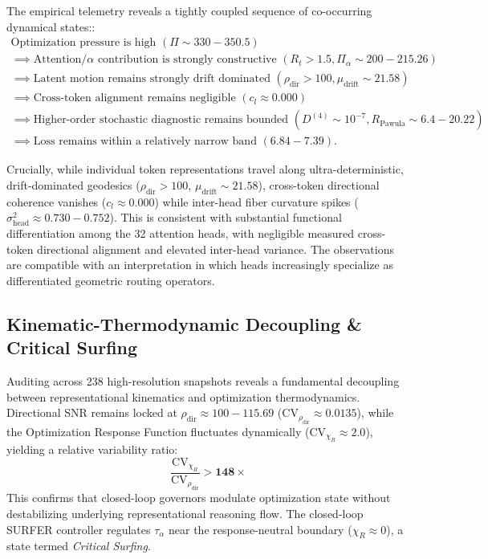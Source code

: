 \documentclass[11pt]{article}
\begin{document}
The empirical telemetry reveals a tightly coupled sequence of co-occurring dynamical states::
\begin{align*}
\text{Optimization pressure is high } (\Pi \sim 330-350.5) \\
\implies \text{Attention/}\alpha \text{ contribution is strongly constructive } (R_t > 1.5, \Pi_\alpha \sim 200-215.26) \\
\implies \text{Latent motion remains strongly drift dominated } (\rho_{\text{dir}} > 100, \mu_{\text{drift}} \sim 21.58) \\
\implies \text{Cross-token alignment remains negligible } (c_l \approx 0.000) \\
\implies \text{Higher-order stochastic diagnostic remains bounded } (D^{(4)} \sim 10^{-7}, R_{\text{Pawula}} \sim 6.4-20.22) \\
\implies \text{Loss remains within a relatively narrow band } (6.84 - 7.39).
\end{align*}

Crucially, while individual token representations travel along ultra-deterministic, drift-dominated geodesics ($\rho_{\text{dir}} > 100$, $\mu_{\text{drift}} \sim 21.58$), cross-token directional coherence vanishes ($c_l \approx 0.000$) while inter-head fiber curvature spikes ($\sigma^2_{\text{head}} \approx 0.730 - 0.752$). This is consistent with substantial functional differentiation among the 32 attention heads, with negligible measured cross-token directional alignment and elevated inter-head variance. \cite{olsson2022in, zhang2025} The observations are compatible with an interpretation in which heads increasingly specialize as differentiated geometric routing operators.

\subsection{Kinematic-Thermodynamic Decoupling \& Critical Surfing}
Auditing across 238 high-resolution snapshots reveals a fundamental decoupling between representational kinematics and optimization thermodynamics. Directional SNR remains locked at $\rho_{\text{dir}} \approx 100 - 115.69$ ($\text{CV}_{\rho_{\text{dir}}} \approx 0.0135$), while the Optimization Response Function fluctuates dynamically ($\text{CV}_{\chi_R} \approx 2.0$), yielding a relative variability ratio:
\begin{equation}
\frac{\text{CV}_{\chi_R}}{\text{CV}_{\rho_{\text{dir}}}} > \mathbf{148\times}
\end{equation}
This confirms that closed-loop governors modulate optimization state without destabilizing underlying representational reasoning flow. The closed-loop SURFER controller regulates $\tau_\alpha$ near the response-neutral boundary ($\chi_R \approx 0$), a state termed \textit{Critical Surfing}.
\end{document}
